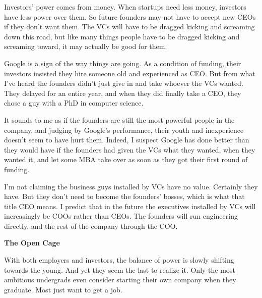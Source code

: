 Investors' power comes
                    from money. When startups need less money, investors have
                    less power over them. So future founders may not have to
                    accept new CEOs if they don't want them. The VCs will have
                    to be dragged kicking and screaming down this road, but like
                    many things people have to be dragged kicking and screaming
                    toward, it may actually be good for them.

Google
                    is a sign of the way things are going. As a condition of
                    funding, their investors insisted they hire someone old and
                    experienced as CEO. But from what I've heard the founders
                    didn't just give in and take whoever the VCs wanted. They
                    delayed for an entire year, and when they did finally take a
                    CEO, they chose a guy with a PhD in computer science.

It
                    sounds to me as if the founders are still the most powerful
                    people in the company, and judging by Google's performance,
                    their youth and inexperience doesn't seem to have hurt them.
                    Indeed, I suspect Google has done better than they would
                    have if the founders had given the VCs what they wanted,
                    when they wanted it, and let some MBA take over as soon as
                    they got their first round of funding.

I'm not
                    claiming the business guys installed by VCs have no value.
                    Certainly they have. But they don't need to become the
                    founders' bosses, which is what that title CEO means. I
                    predict that in the future the executives installed by VCs
                    will increasingly be COOs rather than CEOs. The founders
                    will run engineering directly, and the rest of the company
                    through the COO.

\textbf{The Open Cage}

With both employers and investors, the balance
                    of power is slowly shifting towards the young. And yet they
                    seem the last to realize it. Only the most ambitious
                    undergrads even consider starting their own company when
                    they graduate. Most just want to get a job.

